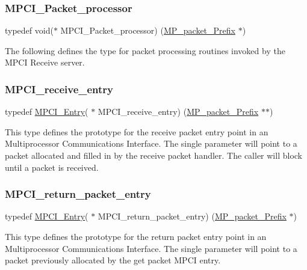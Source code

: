 \subsubsection{\texorpdfstring{MPCI\_Packet\_processor}{MPCI\_Packet\_processor}}
{\footnotesize\ttfamily typedef void($\ast$ M\+P\+C\+I\+\_\+\+Packet\+\_\+processor) (\mbox{\hyperlink{structMP__packet__Prefix}{M\+P\+\_\+packet\+\_\+\+Prefix}} $\ast$)}

The following defines the type for packet processing routines invoked by the M\+P\+CI Receive server. \mbox{\label{group__RTEMSScoreMPCI_ga87bfcaa7cd058fd748d6f4b7f530448b}} 
\subsubsection{\texorpdfstring{MPCI\_receive\_entry}{MPCI\_receive\_entry}}
{\footnotesize\ttfamily typedef \mbox{\hyperlink{group__RTEMSScoreMPCI_ga110fdd671fbc411706e2b281c1685816}{M\+P\+C\+I\+\_\+\+Entry}}( $\ast$ M\+P\+C\+I\+\_\+receive\+\_\+entry) (\mbox{\hyperlink{structMP__packet__Prefix}{M\+P\+\_\+packet\+\_\+\+Prefix}} $\ast$$\ast$)}

This type defines the prototype for the receive packet entry point in an Multiprocessor Communications Interface. The single parameter will point to a packet allocated and filled in by the receive packet handler. The caller will block until a packet is received. \mbox{\label{group__RTEMSScoreMPCI_gaa1869d09a5e31b0810c9efda6171ffa4}} 
\subsubsection{\texorpdfstring{MPCI\_return\_packet\_entry}{MPCI\_return\_packet\_entry}}
{\footnotesize\ttfamily typedef \mbox{\hyperlink{group__RTEMSScoreMPCI_ga110fdd671fbc411706e2b281c1685816}{M\+P\+C\+I\+\_\+\+Entry}}( $\ast$ M\+P\+C\+I\+\_\+return\+\_\+packet\+\_\+entry) (\mbox{\hyperlink{structMP__packet__Prefix}{M\+P\+\_\+packet\+\_\+\+Prefix}} $\ast$)}

This type defines the prototype for the return packet entry point in an Multiprocessor Communications Interface. The single parameter will point to a packet previously allocated by the get packet M\+P\+CI entry. \mbox{\label{group__RTEMSScoreMPCI_gaeacb0c0d07a93283f07abcc5727a23a8}} 
